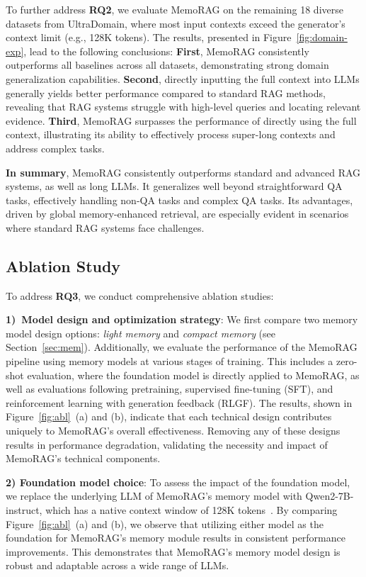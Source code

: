 \documentclass[sigconf]{acmart}
\begin{document}
To further address \textbf{RQ2}, we evaluate MemoRAG on the remaining 18 diverse datasets from UltraDomain, where most input contexts exceed the generator’s context limit (e.g., 128K tokens). The results, presented in Figure~\ref{fig:domain-exp}, lead to the following conclusions: 
\textbf{First}, MemoRAG consistently outperforms all baselines across all datasets, demonstrating strong domain generalization capabilities. \textbf{Second}, directly inputting the full context into LLMs generally yields better performance compared to standard RAG methods, revealing that RAG systems struggle with high-level queries and locating relevant evidence. \textbf{Third}, MemoRAG surpasses the performance of directly using the full context, illustrating its ability to effectively process super-long contexts and address complex tasks.

\textbf{In summary}, MemoRAG consistently outperforms standard and advanced RAG systems, as well as long LLMs. It generalizes well beyond straightforward QA tasks, effectively handling non-QA tasks and complex QA tasks. Its advantages, driven by global memory-enhanced retrieval, are especially evident in scenarios where standard RAG systems face challenges.

\subsection{Ablation Study}
\label{sec:abl}
To address \textbf{RQ3}, we conduct comprehensive ablation studies:

\textbf{1)~Model design and optimization strategy}:
We first compare two memory model design options: \textit{light memory} and \textit{compact memory} (see Section~\ref{sec:mem}). Additionally, we evaluate the performance of the MemoRAG pipeline using memory models at various stages of training. This includes a zero-shot evaluation, where the foundation model is directly applied to MemoRAG, as well as evaluations following pretraining, supervised fine-tuning (SFT), and reinforcement learning with generation feedback (RLGF). The results, shown in Figure~\ref{fig:abl}~(a) and (b), indicate that each technical design contributes uniquely to MemoRAG’s overall effectiveness. Removing any of these designs results in performance degradation, validating the necessity and impact of MemoRAG’s technical components.


\textbf{2) Foundation model choice}: To assess the impact of the foundation model, we replace the underlying LLM of MemoRAG’s memory model with Qwen2-7B-instruct, which has a native context window of 128K tokens~\cite{qwen2}. By comparing Figure~\ref{fig:abl}~(a) and (b), we observe that utilizing either model as the foundation for MemoRAG’s memory module results in consistent performance improvements. This demonstrates that MemoRAG’s memory model design is robust and adaptable across a wide range of LLMs.
\end{document}
